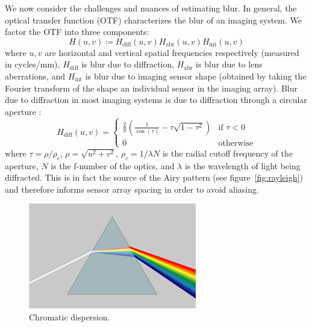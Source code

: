 We now consider the challenges and nuances of estimating blur.
%
In general, the optical transfer function (OTF) characterizes the blur of an imaging system.
%
We factor the OTF into three components:
\begin{equation}
	H(u, v) \coloneqq H_{\text{diff}}(u,v) H_{\text{abr}}(u,v) H_{\text{int}} (u,v)
\end{equation}
where \(u,v\) are horizontal and vertical spatial frequencies respectively (measured in cycles/mm), \(H_{\text{diff}}\) is blur due to diffraction, \(H_{\text{abr}}\) is blur due to lens aberrations, and \(H_{\text{int}}\) is blur due to imaging sensor shape (obtained by taking the Fourier transform of the shape an individual sensor in the imaging array).
%
Blur due to diffraction in most imaging systems is due to diffraction through a circular aperture \cite{goodman2005introduction}:
\begin{equation*}
	H_{\text{diff}}(u,v) =   \begin{cases}
		\frac{2}{\pi} \left(\frac{1}{\cos(\tau)} - \tau \sqrt{1-\tau^2}\right) & \text{if } \tau < 0 \\
		0                                                                      & \text{otherwise}
	\end{cases}
\end{equation*}
where \(\tau = \rho/\rho_c\), \(\rho=\sqrt{u^2 +v^2}\), \(\rho_c = 1/\lambda N\) is the radial cutoff frequency of the aperture, \(N\) is the f-number of the optics, and \(\lambda\) is the wavelength of light being diffracted.
%
This is in fact the source of the Airy pattern (see figure~\ref{fig:rayleigh}) and therefore informs sensor array spacing in order to avoid aliasing.
\begin{figure}
	\includegraphics[width=\linewidth,keepaspectratio]{figures/background/dispersion.png}
	\caption[]{Chromatic dispersion.}\label{fig:dispersion}
\end{figure}
